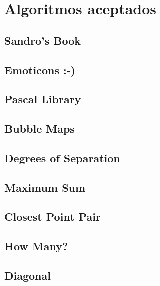 \appendix


\chapter{Algoritmos aceptados}


\newpage
\section{Sandro's Book}


\newpage
\section{Emoticons :-)}


\newpage
\section{Pascal Library}


\newpage
\section{Bubble Maps}


\newpage
\section{Degrees of Separation}


\newpage
\section{Maximum Sum}


\newpage
\section{Closest Point Pair}


\newpage
\section{How Many?}


\newpage
\section{Diagonal}


